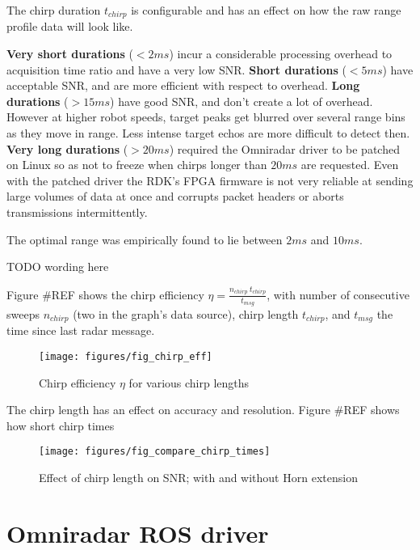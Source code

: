 The chirp duration \(t_{chirp}\) is configurable and has an effect on
how the raw range profile data will look like.

\textbf{Very short durations} (\(<2ms\)) incur a considerable processing
overhead to acquisition time ratio and have a very low SNR.
\textbf{Short durations} (\(<5ms\)) have acceptable SNR, and are more
efficient with respect to overhead. \textbf{Long durations} (\(>15ms\))
have good SNR, and don't create a lot of overhead. However at higher
robot speeds, target peaks get blurred over several range bins as they
move in range. Less intense target echos are more difficult to detect
then. \textbf{Very long durations} (\(>20ms\)) required the Omniradar
driver to be patched on Linux so as not to freeze when chirps longer
than \(20ms\) are requested. Even with the patched driver the RDK's FPGA
firmware is not very reliable at sending large volumes of data at once
and corrupts packet headers or aborts transmissions intermittently.

The optimal range was empirically found to lie between \(2ms\) and
\(10ms\).

TODO wording here

Figure \#REF shows the chirp efficiency
\(\eta = \frac{n_{chirp}~t_{chirp}}{t_{msg}}\), with number of
consecutive sweeps \(n_{chirp}\) (two in the graph's data source), chirp
length \(t_{chirp}\), and \(t_{msg}\) the time since last radar message.

\begin{figure}[htp]
    \centering
    \label{fig:fig_chirp_eff}
    \texttt{[image: figures/fig\_chirp\_eff]}
    \caption{Chirp efficiency \(\eta\) for various chirp lengths}
\end{figure}

The chirp length has an effect on accuracy and resolution. Figure \#REF
shows how short chirp times

\begin{figure}[htp]
    \centering
    \label{fig:fig_compare_chirp_times}
    \texttt{[image: figures/fig\_compare\_chirp\_times]}
    \caption{Effect of chirp length on SNR; with and without Horn extension}
\end{figure}



\section{Omniradar ROS driver}\label{omniradar-ros-driver}

